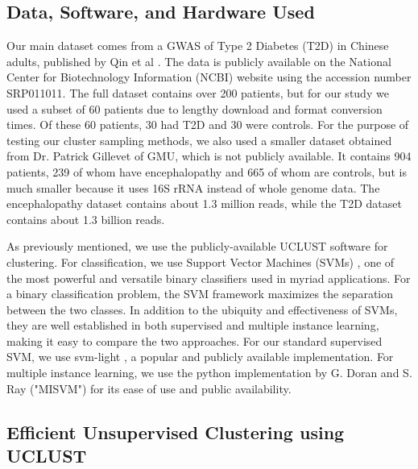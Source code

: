 
\subsection{Data, Software, and Hardware Used}

Our main dataset comes from a GWAS of Type 2 Diabetes (T2D) in Chinese adults, published by Qin et al \cite{qin041012}. The data is publicly available on the National Center for Biotechnology Information (NCBI) \cite{ncbi} website using the accession number SRP011011. The full dataset contains over 200 patients, but for our study we used a subset of 60 patients due to lengthy download and format conversion times. Of these 60 patients, 30 had T2D and 30 were controls. For the purpose of testing our cluster sampling methods, we also used a smaller dataset obtained from Dr. Patrick Gillevet of GMU, which is not publicly available. It contains 904 patients, 239 of whom have encephalopathy and 665 of whom are controls, but is much smaller because it uses 16S rRNA instead of whole genome data. The encephalopathy dataset contains about 1.3 million reads, while the T2D dataset contains about 1.3 billion reads.

As previously mentioned, we use the publicly-available UCLUST \cite{Edgar10} software for clustering. For classification, we use Support Vector Machines (SVMs) \cite{vap95}, one of the most powerful and versatile binary classifiers used 
in myriad applications. 
%
For a  binary classification problem, the SVM framework 
maximizes the separation between the two classes. In addition to the ubiquity and effectiveness of SVMs, they are well established in both supervised and multiple instance learning, making it easy to compare the two approaches. For our standard supervised SVM, we use svm-light \cite{joachims08}, a popular and publicly available implementation. For multiple instance learning, we use the python implementation by G. Doran and S. Ray ("MISVM") \cite{doran122013} for its ease of use and public availability.


\subsection{Efficient Unsupervised Clustering using UCLUST}
\label{uclustmethods}

